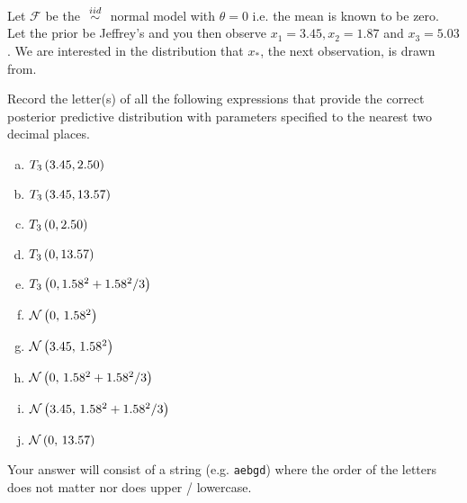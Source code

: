 \documentclass[12pt]{article}
\newcommand{\instr}{Your answer will consist of a string (e.g. \texttt{aebgd}) where the order of the letters does not matter nor does upper / lowercase.}
\begin{document}
\problem [8min] Let $\mathcal{F}$ be the $\iid$ normal model with $\theta = 0$ i.e. the mean is known to be zero. Let the prior be Jeffrey's and you then observe $x_1 = 3.45, x_2 = 1.87$ and $x_3 = 5.03$. We are interested in the distribution that $x_*$, the next observation, is drawn from.

\benum

 Record the letter(s) of all the following expressions that provide the correct posterior predictive distribution with parameters specified to the nearest two decimal places.

\begin{enumerate}[(a)]
\item $T_{3}\left(3.45, 2.50\right)$
\item $T_{3}\left(3.45, 13.57\right)$
\item $T_{3}\left(0, 2.50\right)$
\item $T_{3}\left(0, 13.57\right)$
\item $T_{3}\left(0, 1.58^2 + 1.58^2 / 3\right)$
\item $\mathcal{N}\left(0,\,1.58^2\right)$
\item $\mathcal{N}\left(3.45,\,1.58^2\right)$
\item $\mathcal{N}\left(0,\,1.58^2 + 1.58^2 / 3\right)$
\item $\mathcal{N}\left(3.45,\,1.58^2 + 1.58^2 / 3\right)$
\item $\mathcal{N}\left(0,\,13.57\right)$
\end{enumerate}
\eenum\instr\pagebreak

\end{document}
